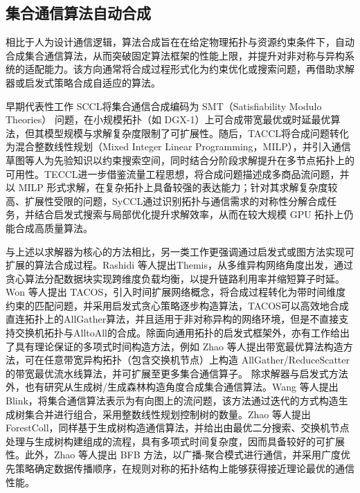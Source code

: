 \subsection{集合通信算法自动合成}

相比于人为设计通信逻辑，算法合成旨在在给定物理拓扑与资源约束条件下，自动合成集合通信算法，从而突破固定算法框架的性能上限，并提升对非对称与异构系统的适配能力。该方向通常将合成过程形式化为约束优化或搜索问题，再借助求解器或启发式策略合成自适应的算法。

早期代表性工作 SCCL\cite{cai2021synthesizing}将集合通信合成编码为 SMT（Satisfiability Modulo Theories） 问题，在小规模拓扑（如 DGX-1）上可合成带宽最优或时延最优算法，但其模型规模与求解复杂度限制了可扩展性。随后，TACCL\cite{shah2023taccl}将合成问题转化为混合整数线性规划（Mixed Integer Linear Programming，MILP），并引入通信草图等人为先验知识以约束搜索空间，同时结合分阶段求解提升在多节点拓扑上的可用性。TECCL\cite{liu2024rethinking}进一步借鉴流量工程思想，将合成问题描述成多商品流问题，并以 MILP 形式求解，在复杂拓扑上具备较强的表达能力；针对其求解复杂度较高、扩展性受限的问题，SyCCL\cite{cao2025syccl}通过识别拓扑与通信需求的对称性分解合成任务，并结合启发式搜索与局部优化提升求解效率，从而在较大规模 GPU 拓扑上仍能合成高质量算法。

与上述以求解器为核心的方法相比，另一类工作更强调通过启发式或图方法实现可扩展的算法合成过程。Rashidi 等人\cite{rashidi2022themis}提出Themis，从多维异构网络角度出发，通过贪心算法分配数据块实现跨维度负载均衡，以提升链路利用率并缩短算子时延。Won 等人\cite{won2024tacos}提出 TACOS，引入时间扩展网络概念，将合成过程转化为带时间维度约束的匹配问题，并采用启发式贪心策略逐步构造算法，TACOS可以高效地合成直连拓扑上的AllGather算法，并且适用于非对称异构的网络环境，但是不直接支持交换机拓扑与AlltoAll的合成。除面向通用拓扑的启发式框架外，亦有工作给出了具有理论保证的多项式时间构造方法，例如 Zhao 等人\cite{zhao2023bandwidth}提出带宽最优算法构造方法，可在任意带宽异构拓扑（包含交换机节点）上构造 AllGather/ReduceScatter 的带宽最优流水线算法，并可扩展至更多集合通信算子。
除求解器与启发式方法外，也有研究从生成树/生成森林构造角度合成集合通信算法。Wang 等人\cite{wang2020blink}提出 Blink，将集合通信算法表示为有向图上的流问题，该方法通过迭代的方式构造生成树集合并进行组合，采用整数线性规划控制树的数量。Zhao 等人\cite{zhao2024forestcoll}提出 ForestColl，同样基于生成树构造通信算法，并给出由最优二分搜索、交换机节点处理与生成树构建组成的流程，具有多项式时间复杂度，因而具备较好的可扩展性。此外，Zhao 等人\cite{zhao2025efficient}提出 BFB 方法，以广播-聚合模式进行通信，并采用广度优先策略确定数据传播顺序，在规则对称的拓扑结构上能够获得接近理论最优的通信性能。

